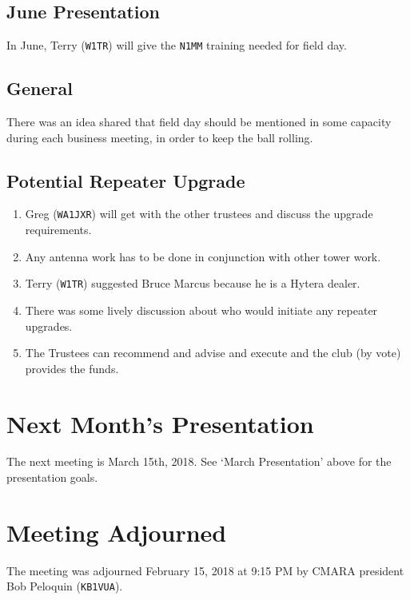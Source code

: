 \documentclass[10pt,letterpaper]{article}
\begin{document}
\subsection{June Presentation}
In June, Terry (\texttt{W1TR}) will give the \texttt{N1MM} training needed for field day.

\subsection{General}
There was an idea shared that field day should be mentioned in some capacity during each business meeting, in order to keep the ball rolling.

\subsection{Potential Repeater Upgrade}
\begin{enumerate}
\item Greg (\texttt{WA1JXR}) will get with the other trustees and discuss the upgrade requirements.
\item Any antenna work has to be done in conjunction with other tower work.
\item Terry (\texttt{W1TR}) suggested Bruce Marcus because he is a Hytera dealer.
\item There was some lively discussion about who would initiate any repeater upgrades.
\item The Trustees can recommend and advise and execute and the club (by vote) provides the funds.
\end{enumerate}

\section{Next Month's Presentation}
The next meeting is March 15th, 2018. See `March Presentation' above for the presentation goals.

\section{Meeting Adjourned}
The meeting was adjourned February 15, 2018 at 9:15 PM by CMARA president Bob Peloquin (\texttt{KB1VUA}).
\end{document}
